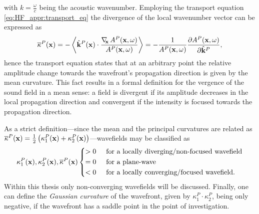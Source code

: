 %
with $k = \frac{\omega}{c}$ being the acoustic wavenumber.
Employing the transport equation \eqref{eq:HF_appr:transport_eq} the divergence of the local wavenumber vector can be expressed as
\begin{equation}
\overline{\kappa}^P(\mathbf{x})
= -\left< \hat{\mathbf{k}}^P(\mathbf{x})\cdot \frac{ \nabla_{\!\!\mathbf{x}}\, A^P(\mathbf{x},\omega) }{A^P(\mathbf{x},\omega)}\right>
= -\frac{ 1 }{ A^P(\mathbf{x},\omega)} \frac{\partial A^P(\mathbf{x},\omega)}{\partial \hat{\mathbf{k}}^P},
\end{equation}
hence the transport equation states that at an arbitrary point the relative amplitude change towards the wavefront's propagation direction is given by the mean curvature.
This fact results in a formal definition for the vergence of the sound field in a mean sense: a field is divergent if its amplitude decreases in the local propagation direction and convergent if the intensity is focused towards the propagation direction.

As a strict definition---since the mean and the principal curvatures are related as $\overline{\kappa}^P(\mathbf{x})  = \frac{1}{2} \left( \kappa_1^P(\mathbf{x})+\kappa_2^P(\mathbf{x}) \right)$---wavefields may be classified as
\begin{equation}
\label{eq:HF_appr:curvature_cases}
\kappa_1^P(\vx),\kappa_2^P(\vx),\overline{\kappa}^P(\vx) 
\begin{cases*}
> 0  \hspace{5mm} \text{for a locally diverging/non-focused wavefield} \\
= 0  \hspace{5mm} \text{for a plane-wave}  \\
< 0  \hspace{5mm} \text{for a locally converging/focused wavefield.} 
\end{cases*}
\end{equation}
Within this thesis only non-converging wavefields will be discussed.
Finally, one can define the \emph{Gaussian curvature} of the wavefront, given by $\kappa^P_1 \cdot \kappa^P_2$, being only negative, if the wavefront has a saddle point in the point of investigation.


